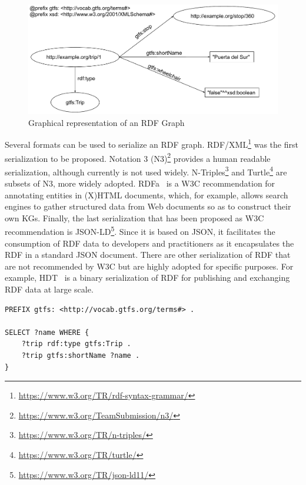 \begin{figure}[!ht]
\centering
\includegraphics[width=\textwidth]{figures/state-of-the-art/RDF.pdf}
\caption{Graphical representation of an RDF Graph}
\label{fig:soa_rdf_example}
\end{figure}


Several formats can be used to serialize an RDF graph. RDF/XML\footnote{\url{https://www.w3.org/TR/rdf-syntax-grammar/}} was the first serialization to be proposed. Notation 3 (N3)\footnote{\url{https://www.w3.org/TeamSubmission/n3/}} provides a human readable serialization, although currently is not used widely. N-Triples\footnote{\url{https://www.w3.org/TR/n-triples/}} and Turtle\footnote{\url{https://www.w3.org/TR/turtle/}} are subsets of N3, more widely adopted. RDFa~\citep{adida2008rdfa} is a W3C recommendation for annotating entities in (X)HTML documents, which, for example, allows search engines to gather structured data from Web documents so as to construct their own KGs. Finally, the last serialization that has been proposed as W3C recommendation is JSON-LD\footnote{\url{https://www.w3.org/TR/json-ld11/}}. Since it is based on JSON, it facilitates the consumption of RDF data to developers and practitioners as it encapsulates the RDF in a standard JSON document. There are other serialization of RDF that are not recommended by W3C but are highly adopted for specific purposes. For example, HDT~\citep{fernandez2013binary} is a binary serialization of RDF for publishing and exchanging RDF data at large scale.

\begin{lstlisting}[float,caption=Example of SPARQL query,frame=tlrb,label={list:soa_sparql_example}, columns=fullflexible]
PREFIX gtfs: <http://vocab.gtfs.org/terms#> .

SELECT ?name WHERE {
    ?trip rdf:type gtfs:Trip .
    ?trip gtfs:shortName ?name .
}
\end{lstlisting}
